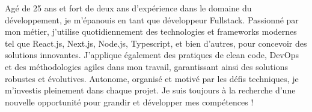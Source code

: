 
\begin{cvparagraph}
    Agé de 25 ans et fort de deux ans d'expérience dans le domaine du développement, je m'épanouis en tant que développeur Fullstack. Passionné par mon métier, j'utilise quotidiennement des technologies et frameworks modernes tel que React.js, Next.js, Node.js, Typescript, et bien d'autres, pour concevoir des solutions innovantes. J'applique également des pratiques de clean code, DevOps et des méthodologies agiles dans mon travail, garantissant ainsi des solutions robustes et évolutives. Autonome, organisé et motivé par les défis techniques, je m'investis pleinement dans chaque projet.
    Je suis toujours à la recherche d'une nouvelle opportunité pour grandir et développer mes compétences !
\end{cvparagraph}
